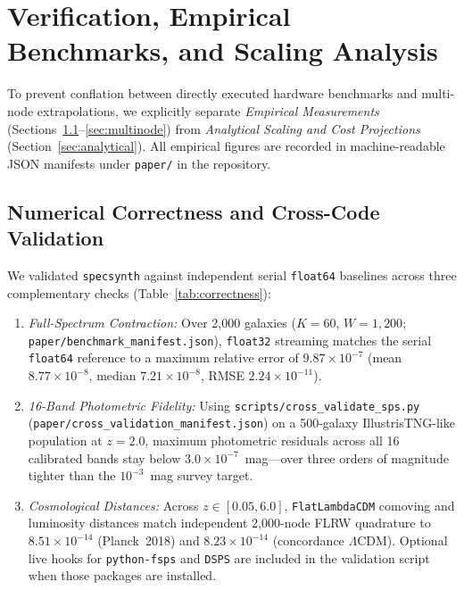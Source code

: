 \documentclass[preprint,12pt,authoryear]{elsarticle}
\begin{document}
\section{Verification, Empirical Benchmarks, and Scaling Analysis}
\label{sec:benchmarks}

To prevent conflation between directly executed hardware benchmarks and multi-node extrapolations, we explicitly separate \emph{Empirical Measurements} (Sections~\ref{sec:correctness}--\ref{sec:multinode}) from \emph{Analytical Scaling and Cost Projections} (Section~\ref{sec:analytical}). All empirical figures are recorded in machine-readable JSON manifests under \texttt{paper/} in the repository.

\subsection{Numerical Correctness and Cross-Code Validation}
\label{sec:correctness}
We validated \texttt{specsynth} against independent serial \texttt{float64} baselines across three complementary checks (Table~\ref{tab:correctness}):
\begin{enumerate}
\item \emph{Full-Spectrum Contraction:} Over 2,000 galaxies ($K=60$, $W=1{,}200$; \texttt{paper/benchmark\_manifest.json}), \texttt{float32} streaming matches the serial \texttt{float64} reference to a maximum relative error of $9.87\times 10^{-7}$ (mean $8.77\times 10^{-8}$, median $7.21\times 10^{-8}$, RMSE $2.24\times 10^{-11}$).
\item \emph{16-Band Photometric Fidelity:} Using \texttt{scripts/cross\_validate\_sps.py} (\texttt{paper/cross\_validation\_manifest.json}) on a 500-galaxy IllustrisTNG-like population at $z=2.0$, maximum photometric residuals across all 16 calibrated bands stay below $3.0\times 10^{-7}$~mag---over three orders of magnitude tighter than the $10^{-3}$~mag survey target.
\item \emph{Cosmological Distances:} Across $z \in [0.05, 6.0]$, \texttt{FlatLambdaCDM} comoving and luminosity distances match independent 2,000-node FLRW quadrature to $8.51\times 10^{-14}$ (Planck~2018) and $8.23\times 10^{-14}$ (concordance $\Lambda$CDM). Optional live hooks for \texttt{python-fsps} and \texttt{DSPS} are included in the validation script when those packages are installed.
\end{enumerate}
\end{document}
